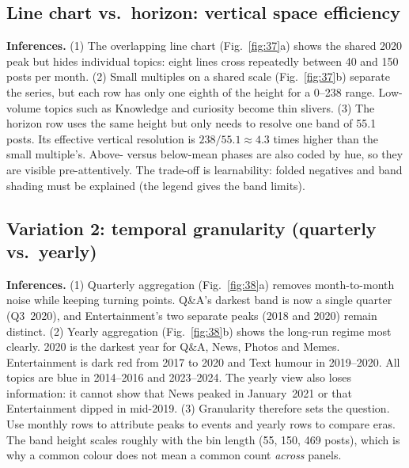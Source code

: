 \subsection{Line chart vs.\ horizon: vertical space efficiency}

\textbf{Inferences.}
(1) The overlapping line chart (Fig.~\ref{fig:37}a) shows the shared 2020 peak but hides individual topics: eight lines
cross repeatedly between 40 and 150 posts per month.
(2) Small multiples on a shared scale (Fig.~\ref{fig:37}b) separate the series, but each row has only one eighth of the
height for a 0--238 range. Low-volume topics such as Knowledge and curiosity become thin slivers.
(3) The horizon row uses the same height but only needs to resolve one band of 55.1 posts. Its effective vertical
resolution is $238/55.1\approx4.3$ times higher than the small multiple's. Above- versus below-mean phases are also coded
by hue, so they are visible pre-attentively. The trade-off is learnability: folded negatives and band shading must be
explained (the legend gives the band limits).

\subsection{Variation 2: temporal granularity (quarterly vs.\ yearly)}

\textbf{Inferences.}
(1) Quarterly aggregation (Fig.~\ref{fig:38}a) removes month-to-month noise while keeping turning points. Q\&A's darkest
band is now a single quarter (Q3~2020), and Entertainment's two separate peaks (2018 and 2020) remain distinct.
(2) Yearly aggregation (Fig.~\ref{fig:38}b) shows the long-run regime most clearly. 2020 is the darkest year for Q\&A,
News, Photos and Memes. Entertainment is dark red from 2017 to 2020 and Text humour in 2019--2020. All topics are blue in
2014--2016 and 2023--2024. The yearly view also loses information: it cannot show that News peaked in January~2021 or
that Entertainment dipped in mid-2019.
(3) Granularity therefore sets the question. Use monthly rows to attribute peaks to events and yearly rows to compare
eras. The band height scales roughly with the bin length (55, 150, 469 posts), which is why a common colour does not mean
a common count \emph{across} panels.

